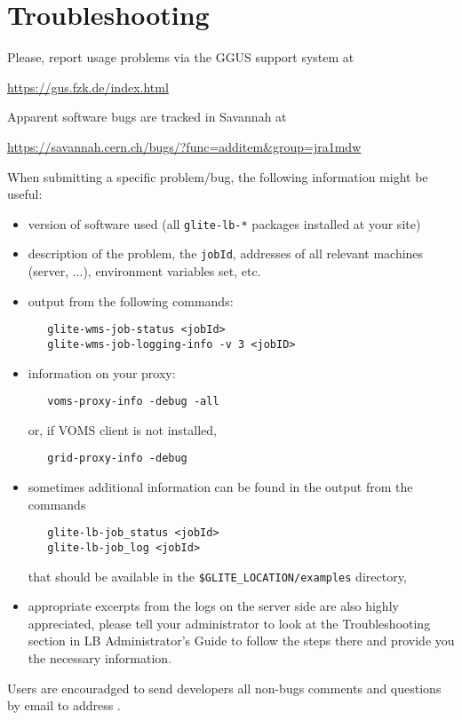 %
%
\section{Troubleshooting}

Please, report usage problems via the GGUS support system at
\begin{center}
\url{https://gus.fzk.de/index.html}
\end{center}
Apparent software bugs are tracked in Savannah at
\begin{center}
\url{https://savannah.cern.ch/bugs/?func=additem&group=jra1mdw}
\end{center}

When submitting a \LB specific problem/bug, the following information might be useful:
\begin{itemize}
\item version of software used (all \verb'glite-lb-*' packages installed at your site)
\item description of the problem, the \verb'jobId', addresses of all relevant
 machines (\LB server, ...), environment variables set, etc.
\item output from the following commands:
\begin{verbatim}
   glite-wms-job-status <jobId>
   glite-wms-job-logging-info -v 3 <jobID>
\end{verbatim}
\item information on your proxy:
\begin{verbatim}
   voms-proxy-info -debug -all
\end{verbatim}
or, if VOMS client is not installed, 
\begin{verbatim}
   grid-proxy-info -debug 
\end{verbatim}
\item sometimes additional information can be found in the output from the commands
\begin{verbatim}
   glite-lb-job_status <jobId>
   glite-lb-job_log <jobId>
\end{verbatim}
that should be available in the \verb'$GLITE_LOCATION/examples' directory,
\item appropriate excerpts from the logs on the server side are also highly appreciated, 
please tell your administrator to look at the Troubleshooting section in LB Administrator's 
Guide \cite{lbag} to follow the steps there and provide you the necessary information.
\end{itemize}

Users are encouradged to send developers all non-bugs comments and questions by email to
address .

